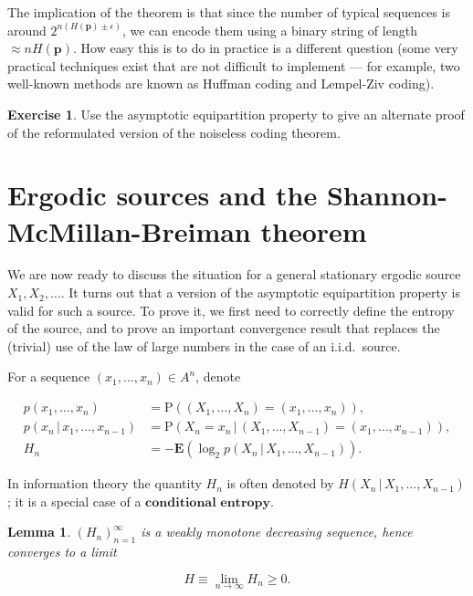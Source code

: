 \documentclass[11pt]{report}
\theoremstyle{plain}
\newtheorem{lem}[thm]{Lemma}
\theoremstyle{definition}
\newtheorem{xexercise}[thm]{Exercise}
\begin{document}
\noindent The implication of the theorem is that since the
number of typical sequences is around
$2^{n(H(\mathbf{p})\pm \epsilon)}$, we can encode
them using a binary string of length
$\approx nH(\mathbf{p})$. How easy this is to do in
practice is a different question (some very practical
techniques exist that are not difficult to implement
--- for example, two well-known methods are known as
Huffman coding and Lempel-Ziv coding).

\begin{xexercise}
Use the asymptotic equipartition property to give an
alternate proof of the reformulated version of the
noiseless coding theorem.
\end{xexercise}

\section{Ergodic sources and the Shannon-McMillan-Breiman theorem}

We are now ready to discuss the situation for a
general stationary ergodic source $X_1,X_2,\ldots$.
It turns out that a version of the asymptotic
equipartition property is valid for such a source. To
prove it, we first need to correctly define the
entropy of the source, and to prove an important
convergence result that replaces the (trivial) use of
the law of large numbers in the case of an i.i.d.\
source.

For a sequence $(x_1,\ldots,x_n)\in A^n$, denote

\begin{align*}
p(x_1,\ldots,x_n) &= \tag{29}\label{eq:psymbols1} \mathrm{P}((X_1,\ldots,X_n)=(x_1,\ldots,x_n)), \\
p(x_n\,|\,x_1,\ldots,x_{n-1}) &= \tag{30}\label{eq:psymbols2} \mathrm{P}(X_n=x_n\,|\,(X_1,\ldots,X_{n-1})=(x_1,\ldots,x_{n-1})),
\\
H_n &= \tag{31}\label{eq:psymbols3} -\mathbf{E}(\log_2 p(X_n\,|\,X_1,\ldots,X_{n-1})).
\end{align*}

\noindent In information theory the quantity $H_n$ is often
denoted by $H(X_n\,|\, X_1,\ldots,X_{n-1})$; it is a
special case of a $\textbf{conditional entropy}$.

\begin{lem}
\label{lem-entropy-ergodic}
$(H_n)_{n=1}^\infty$ is a weakly monotone decreasing
sequence, hence converges to a limit

\begin{equation*} \tag{32}\label{eq:entropy-ergodic}
H \equiv \lim_{n\to\infty} H_n \ge 0.
\end{equation*}

\end{lem}
\end{document}
